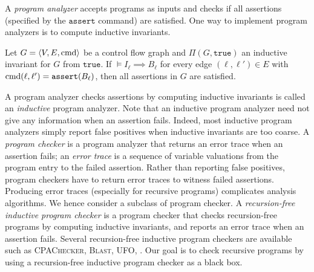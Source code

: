 A \emph{program analyzer} accepts programs as inputs and
checks if all assertions (specified by the $\mathtt{assert}$ command)
are satisfied. One way to implement program analyzers is to compute
inductive invariants. 
\begin{proposition}
Let $G = \langle V, E,\textmd{cmd} \rangle$ be a control flow
graph and $\Pi (G, \mathtt{true})$ an inductive invariant for $G$ from
$\mathtt{true}$. If $\models I_{\ell} \implies B_{\ell}$ for every
edge $(\ell, \ell') \in E$ with $\textmd{cmd} (\ell, \ell') =
\mathtt{assert} (B_{\ell})$, then all assertions in $G$ are satisfied.
\label{proposition:inductive-invariant}
\end{proposition}
A program analyzer checks assertions by computing inductive invariants
is called an \emph{inductive} program analyzer. Note that an inductive
program analyzer need not give any information when an assertion fails. 
Indeed, most inductive program analyzers simply report false positives
when inductive invariants are too coarse. A \emph{program checker} is
a program analyzer that returns an error trace when an assertion
fails; an \emph{error trace} is a sequence of variable valuations from
the program entry to the failed assertion. Rather than reporting false
positives, program checkers have to return error traces to witness 
failed assertions. Producing error traces (especially for recursive
programs) complicates analysis algorithms. We hence consider a
subclass of program checker. A \emph{recursion-free
  inductive program checker} is a program checker that checks
recursion-free programs by computing inductive invariants, and reports
an error trace when an assertion fails. Several recursion-free
inductive program checkers are available such as \textsc{CPAChecker},
\textsc{Blast}, \textsc{UFO}, \textsc{}. Our goal is to check
recursive programs by using a recursion-free inductive program checker
as a black box. 
